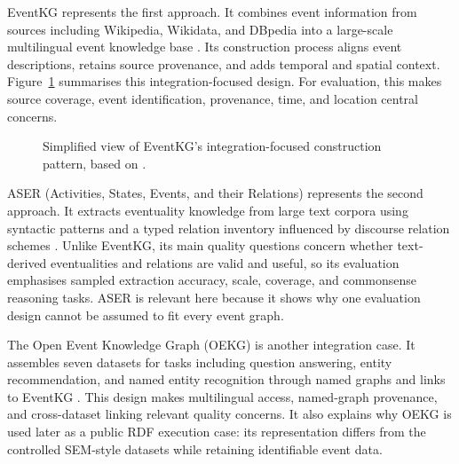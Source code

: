 EventKG represents the first approach. It combines event information from sources including Wikipedia, Wikidata, and DBpedia into a large-scale multilingual event knowledge base \citep{eventkg2018}. Its construction process aligns event descriptions, retains source provenance, and adds temporal and spatial context. Figure~\ref{fig:eventkg-construction-pattern} summarises this integration-focused design. For evaluation, this makes source coverage, event identification, provenance, time, and location central concerns.

\begin{figure}[htbp]
    \centering
    \small
    \caption{Simplified view of EventKG's integration-focused construction pattern, based on \citet{eventkg2018}.}
    \label{fig:eventkg-construction-pattern}
\end{figure}

ASER (Activities, States, Events, and their Relations) represents the second approach. It extracts eventuality knowledge from large text corpora using syntactic patterns and a typed relation inventory influenced by discourse relation schemes \citep{aser2019}. Unlike EventKG, its main quality questions concern whether text-derived eventualities and relations are valid and useful, so its evaluation emphasises sampled extraction accuracy, scale, coverage, and commonsense reasoning tasks. ASER is relevant here because it shows why one evaluation design cannot be assumed to fit every event graph.

The Open Event Knowledge Graph (OEKG) is another integration case. It assembles seven datasets for tasks including question answering, entity recommendation, and named entity recognition through named graphs and links to EventKG \citep{oekg2023}. This design makes multilingual access, named-graph provenance, and cross-dataset linking relevant quality concerns. It also explains why OEKG is used later as a public RDF execution case: its representation differs from the controlled SEM-style datasets while retaining identifiable event data.

